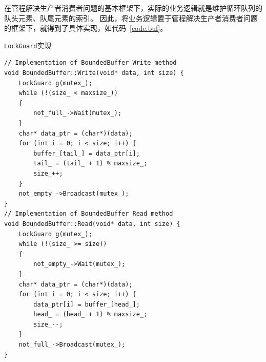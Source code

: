 \documentclass[a4paper,twoside]{article}
\begin{document}
\begin{spacing}{1.2}
在管程解决生产者消费者问题的基本框架下，实际的业务逻辑就是维护循环队列的队头元素、队尾元素的索引。
因此，将业务逻辑置于管程解决生产者消费者问题的框架下，就得到了具体实现，如代码~\ref{code:buf}。
\begin{listing}[htb]
	\caption{\texttt{LockGuard}实现}
	\label{code:buf}
	\begin{verbatim}
// Implementation of BoundedBuffer Write method
void BoundedBuffer::Write(void* data, int size) {
    LockGuard g(mutex_);
    while (!(size_ < maxsize_))
    {
        not_full_->Wait(mutex_);
    }
    char* data_ptr = (char*)(data);
    for (int i = 0; i < size; i++) {
        buffer_[tail_] = data_ptr[i];
        tail_ = (tail_ + 1) % maxsize_;
        size_++;
    }
    not_empty_->Broadcast(mutex_);
}
// Implementation of BoundedBuffer Read method
void BoundedBuffer::Read(void* data, int size) {
    LockGuard g(mutex_);
    while (!(size_ >= size))
    {
        not_empty_->Wait(mutex_);
    }
    char* data_ptr = (char*)(data);
    for (int i = 0; i < size; i++) {
        data_ptr[i] = buffer_[head_];
        head_ = (head_ + 1) % maxsize_;
        size_--;
    }
    not_full_->Broadcast(mutex_);
}
	\end{verbatim}
\end{listing}








\end{spacing}
\end{document}
